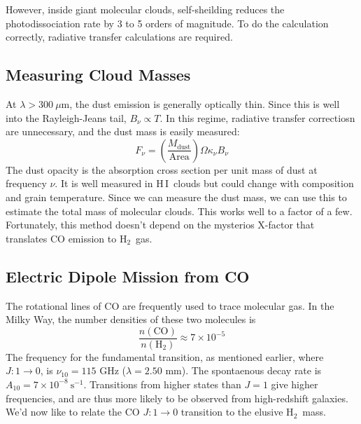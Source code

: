\documentclass[10pt]{article}
\numberwithin{equation}{section}
\newcommand{\n}{\noindent}
\newcommand{\HI}{H\,I\ }
\newcommand{\Htwo}{H$_2$\ }
\begin{document}
  \n However, inside giant molecular clouds, self-sheilding reduces the
  photodissociation rate by 3 to 5 orders of magnitude. To do the calculation
  correctly, radiative transfer calculations are required.
  \subsection{Measuring Cloud Masses} %
  \label{sub:measuring_cloud_masses}
  At $\lambda > 300\ \mu\mathrm{m}$, the dust emission is generally optically
  thin. Since this is well into the Rayleigh-Jeans tail, $B_\nu\propto T$. In
  this regime, radiative transfer correctiosn are unnecessary, and the dust
  mass is easily measured:
  \begin{equation}
    \label{mols:5} F_\nu = \left(\frac{M_{\mathrm{dust}}}{\mathrm{Area}}\right)
    \Omega \kappa_\nu B_\nu
  \end{equation}
  The dust opacity is the absorption cross section per unit mass of dust at
  frequency $\nu$. It is well measured in \HI clouds but could change with
  composition and grain temperature. Since we can measure the dust mass, we can
  use this to estimate the total mass of molecular clouds. This works well to a
  factor of a few. Fortunately, this method doesn't depend on the mysterios 
  X-factor that translates CO emission to \Htwo gas.
  \subsection{Electric Dipole Mission from CO} %
  \label{sub:electric_dipole_mission_from_co}
  The rotational lines of CO are frequently used to trace molecular gas. In the
  Milky Way, the number densities of these two molecules is
  \begin{equation}
    \label{eq:CO:1} \frac{n(\mathrm{CO})}{n(\mathrm{H}_2)} \approx 7\times
    10^{-5}
  \end{equation}
  The frequency for the fundamental transition, as mentioned earlier, where
  $J:1\to 0$, is $\nu_{10} = 115$ GHz ($\lambda = 2.50$ mm). The spontaenous
  decay rate is $A_{10}=7\times 10^{-8}\ \mathrm{s^{-1}}$. Transitions from
  higher states than $J=1$ give higher frequencies, and are thus more likely to
  be observed from high-redshift galaxies. We'd now like to relate the CO
  $J:1\to0$ transition to the elusive \Htwo mass.\\
  
\end{document}
